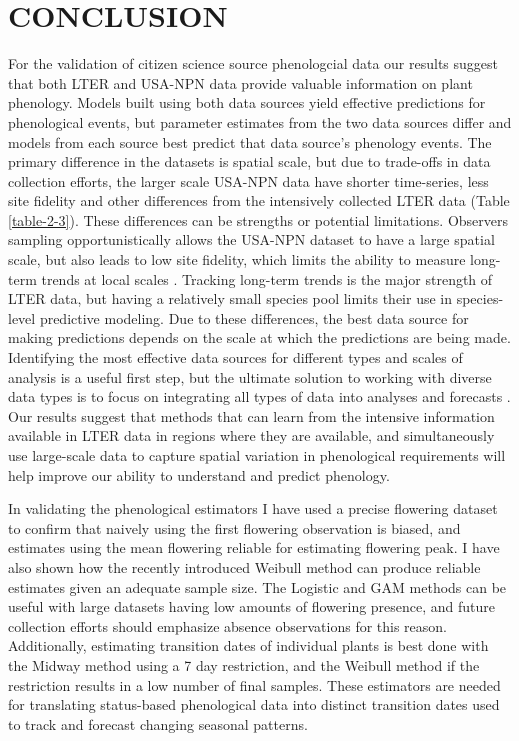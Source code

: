 \chapter{CONCLUSION} \label{conclusion}

For the validation of citizen science source phenologcial data our results suggest that both LTER and USA-NPN data provide valuable information on plant phenology. Models built using both data sources yield effective predictions for phenological events, but parameter estimates from the two data sources differ and models from each source best predict that data source's phenology events. The primary difference in the datasets is spatial scale, but due to trade-offs in data collection efforts, the larger scale USA-NPN data have shorter time-series, less site fidelity and other differences from the intensively collected LTER data (Table \ref{table-2-3}). These differences can be strengths or potential limitations. Observers sampling opportunistically allows the USA-NPN dataset to have a large spatial scale, but also leads to low site fidelity, which limits the ability to measure long-term trends at local scales \citep{gerst2016}. Tracking long-term trends is the major strength of LTER data, but having a relatively small species pool limits their use in species-level predictive modeling. Due to these differences, the best data source for making predictions depends on the scale at which the predictions are being made. Identifying the most effective data sources for different types and scales of analysis is a useful first step, but the ultimate solution to working with diverse data types is to focus on integrating all types of data into analyses and forecasts \citep{hanks2018, melaas2016}. Our results suggest that methods that can learn from the intensive information available in LTER data in regions where they are available, and simultaneously use large-scale data to capture spatial variation in phenological requirements will help improve our ability to understand and predict phenology. 

In validating the phenological estimators I have used a precise flowering dataset to confirm that naively using the first flowering observation is biased, and estimates using the mean flowering reliable for estimating flowering peak. I have also shown how the recently introduced Weibull method can produce reliable estimates given an adequate sample size. The Logistic and GAM methods can be useful with large datasets having low amounts of flowering presence, and future collection efforts should emphasize absence observations for this reason. Additionally, estimating transition dates of individual plants is best done with the Midway method using a 7 day restriction, and the Weibull method if the restriction results in a low number of final samples. These estimators are needed for translating status-based phenological data into distinct transition dates used to track and forecast changing seasonal patterns.

